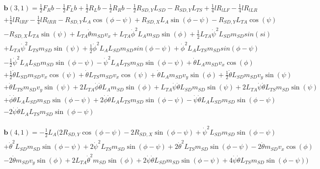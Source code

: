 \begin{linenomath*}
    \vspace{-20pt}
    \begin{multline}
        \mathbf{b}(3,1) = \frac{1}{2}F_Rb - \frac{1}{2}F_Lb + \frac{1}{2}R_Lb - \frac{1}{2}R_Rb - \frac{1}{2}R_{SD,Y}L_{SD} - R_{SD,Y}L_{TS} + \frac{1}{4}lR_{lLF} - \frac{1}{4}lR_{lLR}\\ + \frac{1}{4}l R_{lRF} - \frac{1}{4}l R_{lRR} - R_{SD,Y}L_{A}\cos(\phi - \psi) + R_{SD,X}L_{A}\sin(\phi - \psi) - R_{SD,Y}L_{TA}\cos(\psi)\\ - R_{SD,X}L_{TA}\sin(\psi) + L_{TA}\dot\theta m_{SD}v_x + L_{TA}\dot\phi^2L_{A}m_{SD}\sin(\phi) + \frac{1}{2}L_{TA}\dot\psi^2L_{SD}m_{SD}sin(si)\\ + L_{TA}\dot\psi^2L_{TS}m_{SD}\sin(\psi) + \frac{1}{2}\dot\phi^2L_{A}L_{SD}m_{SD}sin(\phi - \psi) + \dot\phi^2L_{A}L_{TS}m_{SD}sin(\phi - \psi)\\ - \frac{1}{2}\dot\psi^2L_{A}L_{SD}m_{SD}\sin(\phi - \psi) - \dot\psi^2L_{A}L_{TS}m_{SD}\sin(\phi - \psi) + \dot\theta L_{A}m_{SD}v_x\cos(\phi)\\ + \frac{1}{2}\dot\theta L_{SD}m_{SD}v_x\cos(\psi) + \dot\theta L_{TS}m_{SD}v_x\cos(\psi) + \dot\theta L_{A}m_{SD}v_y\sin(\phi) + \frac{1}{2}\dot\theta L_{SD}m_{SD}v_y\sin(\psi)\\ + \dot\theta L_{TS} m_{SD}v_y\sin(\psi) + 2L_{TA}\dot\phi\dot\theta L_{A}m_{SD}\sin(\phi) + L_{TA}\dot\psi\dot\theta L_{SD}m_{SD}\sin(\psi) + 2L_{TA}\dot\psi\dot\theta L_{TS}m_{SD}\sin(\psi)\\ + \dot\phi\dot\theta L_{A}L_{SD}m_{SD}\sin(\phi - \psi) + 2\dot\phi\dot\theta L_{A}L_{TS}m_{SD}\sin(\phi - \psi) - \dot\psi\dot\theta L_{A}L_{SD}m_{SD}\sin(\phi - \psi)\\ - 2\dot\psi\dot\theta L_{A}L_{TS}m_{SD}\sin(\phi - \psi)
    \end{multline}
\end{linenomath*}
\begin{linenomath*}
    \vspace{-20pt}
    \begin{multline}
        \mathbf{b}(4,1) = -\frac{1}{2}L_{A}(2R_{SD,Y}\cos(\phi - \psi) - 2R_{SD,X}\sin(\phi - \psi) + \dot\psi^2L_{SD}m_{SD}\sin(\phi - \psi)\\ + \dot\theta^2L_{SD}m_{SD}\sin(\phi - \psi) + 2\dot\psi^2L_{TS}m_{SD}\sin(\phi - \psi) + 2\dot\theta^2L_{TS}m_{SD}\sin(\phi - \psi) - 2\dot\theta m_{SD}v_x\cos(\phi)\\ - 2\dot\theta m_{SD}v_y\sin(\phi) + 2L_{TA}\dot\theta^2m_{SD}\sin(\phi) + 2\dot\psi\dot\theta L_{SD}m_{SD}\sin(\phi - \psi) + 4\dot\psi\dot\theta L_{TS}m_{SD}\sin(\phi - \psi))
    \end{multline}
\end{linenomath*}
